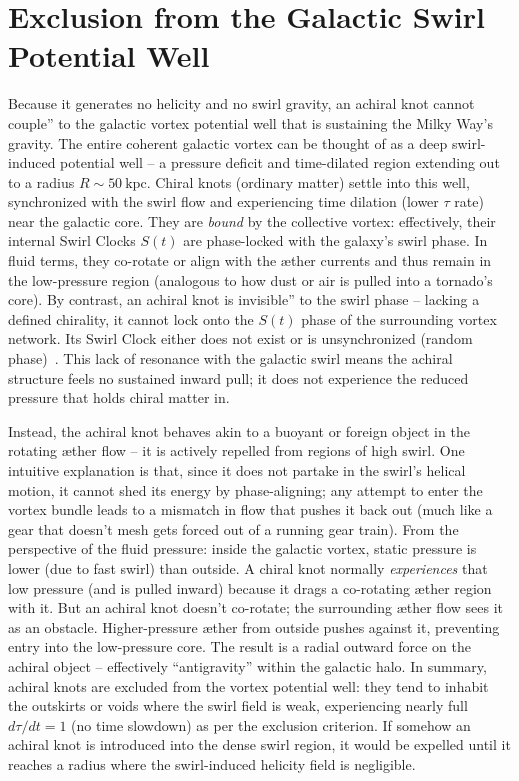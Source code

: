 
\section*{Exclusion from the Galactic Swirl Potential Well}

Because it generates no helicity and no swirl gravity, an achiral knot cannot couple'' to the galactic vortex potential well that is sustaining the Milky Way's gravity. The entire coherent galactic vortex can be thought of as a deep swirl-induced potential well -- a pressure deficit and time-dilated region extending out to a radius $R \sim 50~\text{kpc}$. Chiral knots (ordinary matter) settle into this well, synchronized with the swirl flow and experiencing time dilation (lower $\tau$ rate) near the galactic core. They are \textit{bound} by the collective vortex: effectively, their internal Swirl Clocks $S(t)$ are phase-locked with the galaxy's swirl phase. In fluid terms, they co-rotate or align with the \ae ther currents and thus remain in the low-pressure region (analogous to how dust or air is pulled into a tornado's core). By contrast, an achiral knot is invisible'' to the swirl phase -- lacking a defined chirality, it cannot lock onto the $S(t)$ phase of the surrounding vortex network. Its Swirl Clock either does not exist or is unsynchronized (random phase)~\cite{iskandarani2025vam1}. This lack of resonance with the galactic swirl means the achiral structure feels no sustained inward pull; it does not experience the reduced pressure that holds chiral matter in.

Instead, the achiral knot behaves akin to a buoyant or foreign object in the rotating \ae ther flow -- it is actively repelled from regions of high swirl. One intuitive explanation is that, since it does not partake in the swirl's helical motion, it cannot shed its energy by phase-aligning; any attempt to enter the vortex bundle leads to a mismatch in flow that pushes it back out (much like a gear that doesn't mesh gets forced out of a running gear train). From the perspective of the fluid pressure: inside the galactic vortex, static pressure is lower (due to fast swirl) than outside. A chiral knot normally \textit{experiences} that low pressure (and is pulled inward) because it drags a co-rotating \ae ther region with it. But an achiral knot doesn't co-rotate; the surrounding \ae ther flow sees it as an obstacle. Higher-pressure \ae ther from outside pushes against it, preventing entry into the low-pressure core. The result is a radial outward force on the achiral object -- effectively ``antigravity'' within the galactic halo. In summary, achiral knots are excluded from the vortex potential well: they tend to inhabit the outskirts or voids where the swirl field is weak, experiencing nearly full $d\tau/dt=1$ (no time slowdown) as per the exclusion criterion. If somehow an achiral knot is introduced into the dense swirl region, it would be expelled until it reaches a radius where the swirl-induced helicity field is negligible.

